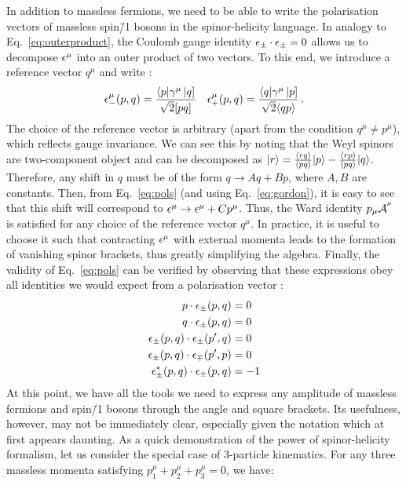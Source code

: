 \documentclass[main.tex]{subfiles}
\begin{document}
In addition to massless fermions, we need to be able to write the polarisation vectors of massless spin\=/1 bosons in the spinor-helicity language. In analogy to Eq.~\ref{eq:outerproduct}, the Coulomb gauge identity $\epsilon_{\pm} \cdot \epsilon_{\pm} = 0$  allows us to decompose $\epsilon^\mu$ into an outer product of two vectors. To this end, we introduce a reference vector $q^\mu$ and write :
\begin{align} \label{eq:pols}
    \epsilon^\mu_{-}(p, q) = \frac{\langle p|\gamma^\mu\left| q \right]}{\sqrt{2}[ pq ]} && \epsilon^\mu_{+}(p, q) = \frac{\langle q|\gamma^\mu\left| p \right]}{\sqrt{2}\langle qp \rangle} \,.
\end{align}
The choice of the reference vector is arbitrary (apart from the condition $q^\mu \neq p^\mu$), which reflects gauge invariance. We can see this by noting that the Weyl spinors are two-component object and can be decomposed as $|r \rangle = \frac{\langle rq \rangle}{\langle pq \rangle}|p \rangle - \frac{\langle rp \rangle}{\langle pq \rangle}|q \rangle$. Therefore, any shift in $q$ must be of the form $q \rightarrow Aq + Bp$, where $A, B$ are constants. Then, from Eq.~\ref{eq:pols} (and using Eq.~\ref{eq:gordon}), it is easy to see that this shift will correspond to $\epsilon^\mu \rightarrow \epsilon^\mu + Cp^\mu$. Thus, the Ward identity $p_\mu \mathcal{A}_{}^{^\mu}$ is satisfied for any choice of the reference vector $q^\mu$. In practice, it is useful to choose it such that contracting $\epsilon^\mu$ with external momenta leads to the formation of vanishing spinor brackets, thus greatly simplifying the algebra. Finally, the validity of Eq.~\ref{eq:pols} can be verified by observing that these expressions obey all identities we would expect from a polarisation vector :
\begin{subequations}
    \begin{align}
        p \cdot \epsilon_\pm(p, q) &= 0 \\
        q \cdot \epsilon_\pm(p, q) &= 0 \\
        \epsilon_\pm (p, q) \cdot \epsilon_\pm(p', q) &= 0 \\
        \epsilon_\pm (p, q) \cdot \epsilon_\mp(p', p) &= 0 \\
        \epsilon_\pm^\ast (p, q) \cdot \epsilon_\pm(p, q) &= -1
    \end{align}
\end{subequations}
At this point, we have all the tools we need to express any amplitude of massless fermions and spin\=/1 bosons through the angle and square brackets. Its usefulness, however, may not be immediately clear, especially given the notation which at first appears daunting. As a quick demonstration of the power of spinor-helicity formalism, let us consider the special case of 3-particle kinematics. For any three massless momenta satisfying $p_1^\mu + p_2^\mu + p_3^\mu = 0$, we have:
\end{document}

